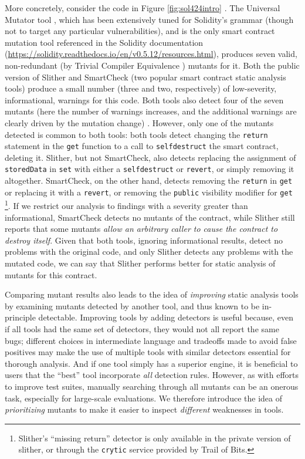 More concretely, consider the code in Figure \ref{fig:sol424intro} \cite{solintro}.  The Universal Mutator tool \cite{universalmutator,regexpMut}, which has been extensively tuned for Solidity's grammar (though not to target any particular vulnerabilities), and is the only smart contract mutation tool referenced in the Solidity documentation (\url{https://solidity.readthedocs.io/en/v0.5.12/resources.html}), produces seven valid, non-redundant (by Trivial Compiler Equivalence \cite{TCE}) mutants for it.  Both the public version of Slither \cite{slither} and SmartCheck \cite{smartcheck} (two popular smart contract static analysis tools) produce a small number (three and two, respectively) of low-severity, informational, warnings for this code.  Both tools also detect four of the seven mutants (here the number of warnings increases, and the additional warnings are clearly driven by the mutation change) .  However, only one of the mutants detected is common to both tools: both tools detect changing the {\tt return} statement in the {\tt get} function to a call to {\tt selfdestruct} the smart contract, deleting it.  Slither, but not SmartCheck, also detects replacing the assignment of {\tt storedData} in {\tt set} with either a {\tt selfdestruct} or {\tt revert}, or simply removing it altogether.  SmartCheck, on the other hand, detects removing the {\tt return} in {\tt get} or replacing it with a {\tt revert}, or removing the {\tt public} visibility modifier for {\tt get} \footnote{Slither's ``missing return'' detector is only available in the private version of slither, or through the {\tt crytic} service provided by Trail of Bits.}.  If we restrict our analysis to findings with a severity greater than informational, SmartCheck detects no mutants of the contract, while Slither still reports that some mutants \emph{allow an arbitrary caller to cause the contract to destroy itself}.  Given that both tools, ignoring informational results, detect no problems with the original code, and only Slither detects any problems with the mutated code, we can say that Slither performs better for static analysis of mutants for this contract.

Comparing mutant results also leads to the idea of \emph{improving} static analysis tools by examining mutants detected by another tool, and thus known to be in-principle detectable.  Improving tools by adding detectors is useful because, even if all tools had the same set of detectors, they would not all report the same bugs; different choices in intermediate language and tradeoffs made to avoid false positives may make the use of multiple tools with similar detectors essential for thorough analysis.  And if one tool simply has a superior engine, it is beneficial to users that the ``best'' tool incorporate \emph{all} detection rules.
However, as with efforts to improve test suites, manually searching through all mutants can be an onerous task, especially for large-scale evaluations.  We therefore introduce the idea of \emph{prioritizing} mutants to make it easier to inspect \emph{different} weaknesses in tools.

